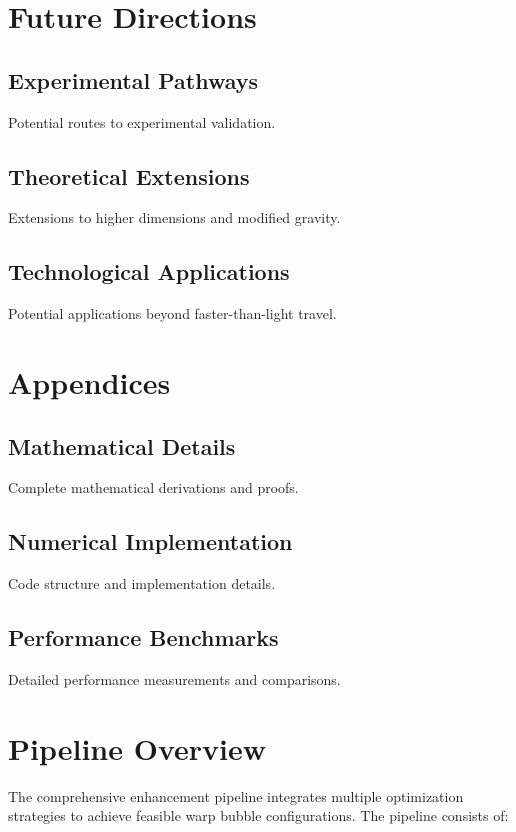 \documentclass{article}
\begin{document}
\section{Future Directions}

\subsection{Experimental Pathways}
Potential routes to experimental validation.

\subsection{Theoretical Extensions}
Extensions to higher dimensions and modified gravity.

\subsection{Technological Applications}
Potential applications beyond faster-than-light travel.

\section{Appendices}

\subsection{Mathematical Details}
Complete mathematical derivations and proofs.

\subsection{Numerical Implementation}
Code structure and implementation details.

\subsection{Performance Benchmarks}
Detailed performance measurements and comparisons.

\section{Pipeline Overview}

The comprehensive enhancement pipeline integrates multiple optimization strategies to achieve feasible warp bubble configurations. The pipeline consists of:
\end{document}
